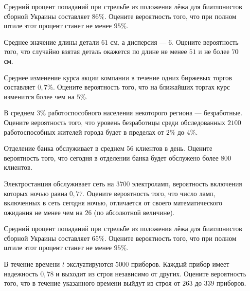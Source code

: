 \vfill

\newpage\setcounter{zad}{0}

\z Средний процент попаданий при стрельбе из положения лёжа для биатлонистов сборной Украины составляет $ 86 \% $. Оцените вероятность того, что при полном штиле этот процент станет не менее $ 95 \% $.


\vfill

\z Среднее значение длины детали $ 61 $ см, а дисперсия --- $ 6 $. Оцените вероятность того, что случайно взятая деталь окажется по длине не менее $ 51 $ и не более $ 70 $ см.
 

\vfill

\newpage\setcounter{zad}{0}

\z Среднее изменение курса акции компании в течение одних биржевых торгов составляет $ 0{,}7 \% $. Оцените вероятность того, что на ближайших торгах курс изменится более чем на $ 5 \% $.


\vfill

\z В среднем $ 3 \% $ работоспособного населения некоторого региона --- безработные. Оцените вероятность того, что уровень безработицы среди обследованных $ 2100 $ работоспособных жителей города будет в пределах от $ 2 \%$ до $ 4 \%$.
 

\vfill

\newpage\setcounter{zad}{0}

\z Отделение банка обслуживает в среднем $ 56 $ клиентов в день. Оцените вероятность того, что сегодня в отделении банка будет обслужено более $ 800 $ клиентов.


\vfill

\z Электростанция обслуживает сеть на $ 3700 $ электроламп, вероятность включения которых ночью равна $ 0{,}77 $. Оцените вероятность того, что число ламп, включенных в сеть сегодня ночью, отличается от своего математического ожидания не менее чем на $ 26 $ (по абсолютной величине). 
 

\vfill

\newpage\setcounter{zad}{0}

\z Средний процент попаданий при стрельбе из положения лёжа для биатлонистов сборной Украины составляет $ 65 \% $. Оцените вероятность того, что при полном штиле этот процент станет не менее $ 95 \% $.


\vfill

\z В течение времени $t$ экслуатируются $ 5000 $ приборов. Каждый прибор имеет надежность $ 0{,}78 $ и выходит из строя независимо от других. Оцените вероятность того, что в течение указанного времени выйдут из строя от $ 263 $ до $ 339 $ приборов.
 

